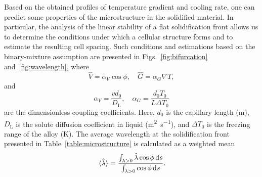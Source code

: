 \documentclass{article}
\newcommand{\liq}{\text{L}}
\begin{document}
Based on the obtained profiles of temperature gradient and cooling rate,
one can predict some properties of the microstructure in the solidified material.
In particular, the analysis of the linear stability of a flat solidification front allows us
to determine the conditions under which a cellular structure forms and to estimate the resulting cell spacing.
Such conditions and estimations based on the binary-mixture assumption are presented
in Figs.~\ref{fig:bifurcation} and~\ref{fig:wavelength}, where
\begin{equation}\label{eq:hatVG}
    \hat{V} = \alpha_V\cos\phi, \quad \hat{G} = \alpha_G\nabla{T},
\end{equation}
and
\begin{equation}\label{eq:alphaVG}
    \alpha_V = \frac{vd_0}{D_\liq}, \quad \alpha_G = \frac{d_0T_0}{L\Delta{T}_0}
\end{equation}
are the dimensionless coupling coefficients.
Here, $d_0$ is the capillary length (\si{\m}),
$D_\liq$ is the solute diffusion coefficient in liquid (\si{\m\squared\per\s}),
and $\Delta{T}_0$ is the freezing range of the alloy (\si{\K}).
The average wavelength at the solidification front presented in Table~\ref{table:microstructure}
is calculated as a weighted mean
\begin{equation}\label{eq:mean_wavelength}
    \ev*{\hat\lambda} = \frac{\int_{\lambda>0}\hat\lambda\cos\phi\dd{s}}{\int_{\lambda>0}\cos\phi\dd{s}}.
\end{equation}

\printbibliography
\end{document}
